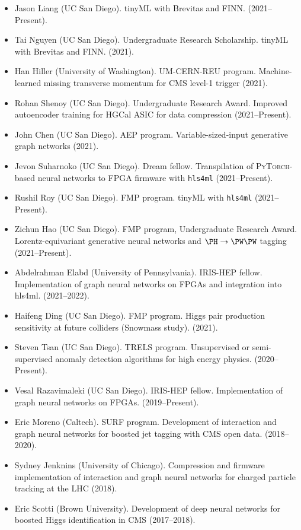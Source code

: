 \documentclass[11pt]{res}
\begin{document}
\begin{resume}
\begin{itemize}
    \item Jason Liang (UC San Diego). tinyML with Brevitas and FINN. ({2021--Present}).
    \item Tai Nguyen (UC San Diego). Undergraduate Research Scholarship. tinyML with Brevitas and FINN. ({2021}).
    \item Han Hiller (University of Washington). UM-CERN-REU program. Machine-learned missing transverse momentum for CMS level-1 trigger ({2021}).
    \item Rohan Shenoy (UC San Diego). Undergraduate Research Award. Improved autoencoder training for HGCal ASIC for data compression ({2021--Present}).
    \item John Chen (UC San Diego). AEP program. Variable-sized-input generative graph networks ({2021}).
    \item Jevon Suharnoko (UC San Diego). Dream fellow. Transpilation of \textsc{PyTorch}-based neural networks to FPGA firmware with \texttt{hls4ml} ({2021--Present}).
    \item Rushil Roy (UC San Diego). FMP program. tinyML with \texttt{hls4ml} ({2021--Present}).
    \item Zichun Hao (UC San Diego). FMP program, Undergraduate Research Award. Lorentz-equivariant generative neural networks and $\PH\to\PW\PW$ tagging ({2021--Present}).
    \item Abdelrahman Elabd (University of Pennsylvania). IRIS-HEP fellow. Implementation of graph neural networks on FPGAs and integration into hls4ml. ({2021--2022}).
    \item Haifeng Ding (UC San Diego). FMP program. Higgs pair production sensitivity at future colliders (Snowmass study). ({2021}).
    \item Steven Tsan (UC San Diego). TRELS program. Unsupervised or semi-supervised anomaly detection algorithms for high energy physics. ({2020--Present}).
    \item Vesal Razavimaleki (UC San Diego). IRIS-HEP fellow. Implementation of graph neural networks on FPGAs. ({2019--Present}).
    \item Eric Moreno (Caltech). SURF program. Development of interaction and graph neural networks for boosted jet tagging with CMS open data. ({2018--2020}).
    \item Sydney Jenknins (University of Chicago). Compression and firmware implementation of interaction and graph neural networks for charged particle tracking at the LHC ({2018}).
    \item Eric Scotti (Brown University). Development of deep neural networks for boosted Higgs identification in CMS ({2017--2018}).

\end{itemize}
\end{resume}
\end{document}
